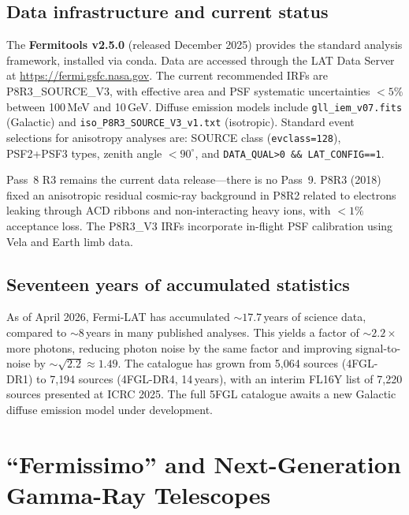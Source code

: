 \documentclass[10pt,a4paper]{article}
\begin{document}
\subsection{Data infrastructure and current status}

The \textbf{Fermitools v2.5.0} (released December 2025) provides the standard analysis framework, installed via conda. Data are accessed through the LAT Data Server at \url{https://fermi.gsfc.nasa.gov}. The current recommended IRFs are P8R3\_SOURCE\_V3, with effective area and PSF systematic uncertainties $<5\%$ between 100\,MeV and 10\,GeV. Diffuse emission models include \texttt{gll\_iem\_v07.fits} (Galactic) and \texttt{iso\_P8R3\_SOURCE\_V3\_v1.txt} (isotropic). Standard event selections for anisotropy analyses are: SOURCE class (\texttt{evclass=128}), PSF2+PSF3 types, zenith angle $< 90^\circ$, and \texttt{DATA\_QUAL>0 \&\& LAT\_CONFIG==1}.

Pass~8 R3 remains the current data release---there is no Pass~9. P8R3 (2018) fixed an anisotropic residual cosmic-ray background in P8R2 related to electrons leaking through ACD ribbons and non-interacting heavy ions, with $<1\%$ acceptance loss. The P8R3\_V3 IRFs incorporate in-flight PSF calibration using Vela and Earth limb data.

\subsection{Seventeen years of accumulated statistics}

As of April 2026, Fermi-LAT has accumulated $\sim17.7$\,years of science data, compared to $\sim8$\,years in many published analyses. This yields a factor of $\sim2.2\times$ more photons, reducing photon noise by the same factor and improving signal-to-noise by $\sim\sqrt{2.2} \approx 1.49$. The catalogue has grown from 5{,}064 sources (4FGL-DR1) to 7{,}194 sources (4FGL-DR4, 14\,years), with an interim FL16Y list of 7{,}220 sources presented at ICRC 2025. The full 5FGL catalogue awaits a new Galactic diffuse emission model under development.


\section{``Fermissimo'' and Next-Generation Gamma-Ray Telescopes}
\label{sec:fermissimo}
\end{document}
